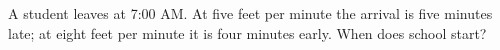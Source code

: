 A student leaves at 7:00 AM. At five feet per minute the arrival is five minutes late; at eight feet per minute it is four minutes early. When does school start?
